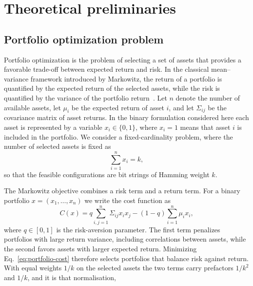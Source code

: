 \section{\label{sec:preliminaries}Theoretical preliminaries}

\subsection{Portfolio optimization problem}

Portfolio optimization is the problem of selecting a set of assets that
provides a favorable trade-off between expected return and risk. In the
classical mean--variance framework introduced by Markowitz, the return of a
portfolio is quantified by the expected return of the selected assets, while
the risk is quantified by the variance of the portfolio
return~\cite{Markowitz1952,Markowitz1959}. Let $n$ denote the number of
available assets, let $\mu_i$ be the expected return of asset $i$, and let
$\Sigma_{ij}$ be the covariance matrix of asset returns. In the binary
formulation considered here each asset is represented by a variable
$x_i\in\{0,1\}$, where $x_i=1$ means that asset $i$ is included in the
portfolio. We consider a fixed-cardinality problem, where the number of
selected assets is fixed as
\begin{equation}
    \sum_{i=1}^{n} x_i = k ,
    \label{eq:cardinality}
\end{equation}
so that the feasible configurations are bit strings of Hamming weight $k$.

The Markowitz objective combines a risk term and a return term. For a binary
portfolio $x=(x_1,\ldots,x_n)$ we write the cost function as
\begin{equation}
    C(x)
    =
    q \sum_{i,j=1}^{n} \Sigma_{ij} x_i x_j
    -
    (1-q)\sum_{i=1}^{n} \mu_i x_i ,
    \label{eq:portfolio-cost}
\end{equation}
where $q\in[0,1]$ is the risk-aversion parameter. The first term penalizes
portfolios with large return variance, including correlations between assets,
while the second favors assets with larger expected return. Minimizing
Eq.~\eqref{eq:portfolio-cost} therefore selects portfolios that balance risk
against return. With equal weights $1/k$ on the selected assets the two terms
carry prefactors $1/k^{2}$ and $1/k$, and it is that normalisation,

